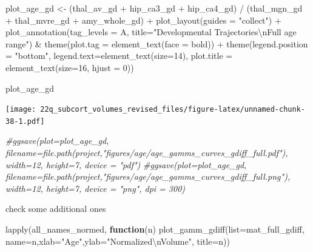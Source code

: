 \documentclass[
]{article}
\newenvironment{Shaded}{\begin{snugshade}}{\end{snugshade}}
\newcommand{\AttributeTok}[1]{\textcolor[rgb]{0.77,0.63,0.00}{#1}}
\newcommand{\CommentTok}[1]{\textcolor[rgb]{0.56,0.35,0.01}{\textit{#1}}}
\newcommand{\ControlFlowTok}[1]{\textcolor[rgb]{0.13,0.29,0.53}{\textbf{#1}}}
\newcommand{\DecValTok}[1]{\textcolor[rgb]{0.00,0.00,0.81}{#1}}
\newcommand{\FunctionTok}[1]{\textcolor[rgb]{0.00,0.00,0.00}{#1}}
\newcommand{\NormalTok}[1]{#1}
\newcommand{\OtherTok}[1]{\textcolor[rgb]{0.56,0.35,0.01}{#1}}
\newcommand{\SpecialCharTok}[1]{\textcolor[rgb]{0.00,0.00,0.00}{#1}}
\newcommand{\StringTok}[1]{\textcolor[rgb]{0.31,0.60,0.02}{#1}}
\begin{document}
\begin{Shaded}
\begin{Highlighting}[]
\NormalTok{plot\_age\_gd }\OtherTok{\textless{}{-}}\NormalTok{ (thal\_av\_gd }\SpecialCharTok{+}\NormalTok{ hip\_ca3\_gd }\SpecialCharTok{+}\NormalTok{ hip\_ca4\_gd) }\SpecialCharTok{/}\NormalTok{ (thal\_mgn\_gd }\SpecialCharTok{+}\NormalTok{ thal\_mvre\_gd }\SpecialCharTok{+}\NormalTok{ amy\_whole\_gd) }\SpecialCharTok{+} \FunctionTok{plot\_layout}\NormalTok{(}\AttributeTok{guides =} \StringTok{"collect"}\NormalTok{) }\SpecialCharTok{+} \FunctionTok{plot\_annotation}\NormalTok{(}\AttributeTok{tag\_levels =} \StringTok{\textquotesingle{}A\textquotesingle{}}\NormalTok{, }\AttributeTok{title=}\StringTok{"Developmental Trajectories}\SpecialCharTok{\textbackslash{}n}\StringTok{Full age range"}\NormalTok{) }\SpecialCharTok{\&}   \FunctionTok{theme}\NormalTok{(}\AttributeTok{plot.tag =} \FunctionTok{element\_text}\NormalTok{(}\AttributeTok{face =} \StringTok{\textquotesingle{}bold\textquotesingle{}}\NormalTok{)) }\SpecialCharTok{+} \FunctionTok{theme}\NormalTok{(}\AttributeTok{legend.position =} \StringTok{"bottom"}\NormalTok{, }\AttributeTok{legend.text=}\FunctionTok{element\_text}\NormalTok{(}\AttributeTok{size=}\DecValTok{14}\NormalTok{), }\AttributeTok{plot.title =} \FunctionTok{element\_text}\NormalTok{(}\AttributeTok{size=}\DecValTok{16}\NormalTok{, }\AttributeTok{hjust =} \DecValTok{0}\NormalTok{)) }

\NormalTok{plot\_age\_gd}
\end{Highlighting}
\end{Shaded}

\texttt{[image: 22q\_subcort\_volumes\_revised\_files/figure-latex/unnamed-chunk-38-1.pdf]}

\begin{Shaded}
\begin{Highlighting}[]
\CommentTok{\#ggsave(plot=plot\_age\_gd, filename=file.path(project,"figures/age/age\_gamms\_curves\_gdiff\_full.pdf"), width=12, height=7, device = "pdf")}
\CommentTok{\#ggsave(plot=plot\_age\_gd, filename=file.path(project,"figures/age/age\_gamms\_curves\_gdiff\_full.png"), width=12, height=7, device = "png", dpi = 300)}
\end{Highlighting}
\end{Shaded}

check some additional ones

\begin{Shaded}
\begin{Highlighting}[]
\FunctionTok{lapply}\NormalTok{(all\_names\_normed, }\ControlFlowTok{function}\NormalTok{(n) }\FunctionTok{plot\_gamm\_gdiff}\NormalTok{(}\AttributeTok{list=}\NormalTok{mat\_full\_gdiff, }\AttributeTok{name=}\NormalTok{n,}\AttributeTok{xlab=}\StringTok{"Age"}\NormalTok{,}\AttributeTok{ylab=}\StringTok{"Normalized}\SpecialCharTok{\textbackslash{}n}\StringTok{Volume"}\NormalTok{, }\AttributeTok{title=}\NormalTok{n))}
\end{Highlighting}
\end{Shaded}
\end{document}
